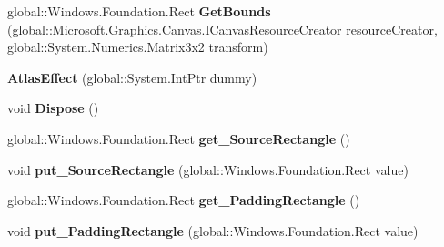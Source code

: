 \begin{DoxyCompactItemize}
\mbox{\label{class_microsoft_1_1_graphics_1_1_canvas_1_1_effects_1_1_atlas_effect_af407ba20dad039a6d8dbb231b3b3718d}} 
global\+::\+Windows.\+Foundation.\+Rect {\bfseries Get\+Bounds} (global\+::\+Microsoft.\+Graphics.\+Canvas.\+I\+Canvas\+Resource\+Creator resource\+Creator, global\+::\+System.\+Numerics.\+Matrix3x2 transform)
\item 
\mbox{\label{class_microsoft_1_1_graphics_1_1_canvas_1_1_effects_1_1_atlas_effect_a9224bd02ca7d3b31765c8f85e77066bd}} 
{\bfseries Atlas\+Effect} (global\+::\+System.\+Int\+Ptr dummy)
\item 
\mbox{\label{class_microsoft_1_1_graphics_1_1_canvas_1_1_effects_1_1_atlas_effect_a565fbf00024f2bc49eda0142d8328107}} 
void {\bfseries Dispose} ()
\item 
\mbox{\label{class_microsoft_1_1_graphics_1_1_canvas_1_1_effects_1_1_atlas_effect_aef2eff3d4b0a6e08db65a1ec2b79dd7c}} 
global\+::\+Windows.\+Foundation.\+Rect {\bfseries get\+\_\+\+Source\+Rectangle} ()
\item 
\mbox{\label{class_microsoft_1_1_graphics_1_1_canvas_1_1_effects_1_1_atlas_effect_a5b0831a587ccba8f8446c7c800898567}} 
void {\bfseries put\+\_\+\+Source\+Rectangle} (global\+::\+Windows.\+Foundation.\+Rect value)
\item 
\mbox{\label{class_microsoft_1_1_graphics_1_1_canvas_1_1_effects_1_1_atlas_effect_a7e457bab07ec38167bce72c522e34743}} 
global\+::\+Windows.\+Foundation.\+Rect {\bfseries get\+\_\+\+Padding\+Rectangle} ()
\item 
\mbox{\label{class_microsoft_1_1_graphics_1_1_canvas_1_1_effects_1_1_atlas_effect_ab39b71d277811975989494c96fa44eb8}} 
void {\bfseries put\+\_\+\+Padding\+Rectangle} (global\+::\+Windows.\+Foundation.\+Rect value)
\item 

\end{DoxyCompactItemize}
